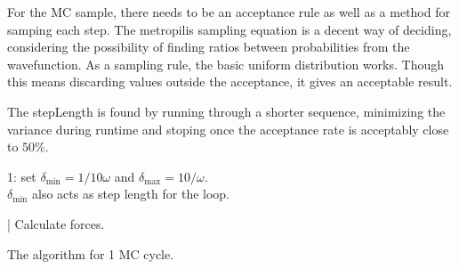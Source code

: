 \documentclass[10pt]{revtex4-1}
\begin{document}
For the MC sample, there needs to be an acceptance rule as well as a method for samping each step. The metropilis sampling equation is a decent way of deciding,
considering the possibility of finding ratios between probabilities from the wavefunction. As a sampling rule, the basic uniform distribution works.
Though this means discarding values outside the acceptance, it gives an acceptable result.

The stepLength is found by running through a shorter sequence, minimizing the variance during runtime and stoping once the acceptance rate is
acceptably close to $50\%$.
\begin{algorithm}
    1: set $\delta_{\min} =1/10\omega$ and $\delta_{\max}=10/\omega$.\\
    $\delta_{\min}$ also acts as step length for the loop. \\
    \For{ \delta \in \qty[ \delta_{\min}, \delta{\max} ] }{
    }
\end{algorithm}

\begin{algorithm}
    | Calculate forces.
    \caption{The algorithm for 1 MC cycle. }
\end{algorithm}
\end{document}
